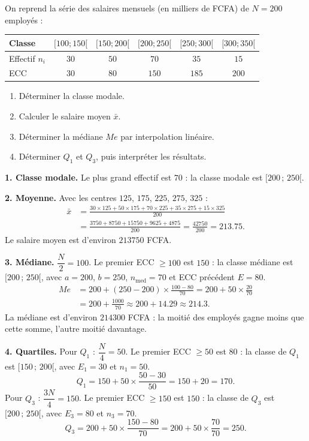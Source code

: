 \documentclass[11pt]{article}
\begin{document}
\begin{exoresolu}
On reprend la série des salaires mensuels (en milliers de FCFA) de $N=200$ employés :
\begin{center}
\begin{tabular}{|l|c|c|c|c|c|}
\hline
Classe & $[100;150[$ & $[150;200[$ & $[200;250[$ & $[250;300[$ & $[300;350[$ \\
\hline Effectif $n_i$ & $30$ & $50$ & $70$ & $35$ & $15$ \\
\hline ECC & $30$ & $80$ & $150$ & $185$ & $200$ \\
\hline
\end{tabular}
\end{center}
\begin{enumerate}
\item Déterminer la classe modale.
\item Calculer le salaire moyen $\bar{x}$.
\item Déterminer la médiane $Me$ par interpolation linéaire.
\item Déterminer $Q_1$ et $Q_3$, puis interpréter les résultats.
\end{enumerate}
\tcblower
\textbf{1. Classe modale.} Le plus grand effectif est $70$ : la classe modale est $[200\,;\,250[$.

\textbf{2. Moyenne.} Avec les centres $125$, $175$, $225$, $275$, $325$ :
\begin{align*}
\bar{x} &= \frac{30\times 125 + 50\times 175 + 70\times 225 + 35\times 275 + 15\times 325}{200} \\
&= \frac{\num{3750} + \num{8750} + \num{15750} + \num{9625} + \num{4875}}{200} = \frac{\num{42750}}{200} = \num{213,75}.
\end{align*}
Le salaire moyen est d'environ $\num{213750}$ FCFA.

\textbf{3. Médiane.} $\dfrac{N}{2} = 100$. Le premier ECC $\geq 100$ est $150$ : la classe médiane est $[200\,;\,250[$, avec $a=200$, $b=250$, $n_{\text{med}} = 70$ et ECC précédent $E = 80$.
\begin{align*}
Me &= 200 + (250-200)\times\frac{100 - 80}{70} = 200 + 50\times\frac{20}{70} \\
&= 200 + \frac{\num{1000}}{70} \approx 200 + \num{14,29} \approx \num{214,3}.
\end{align*}
La médiane est d'environ $\num{214300}$ FCFA : la moitié des employés gagne moins que cette somme, l'autre moitié davantage.

\textbf{4. Quartiles.} Pour $Q_1$ : $\dfrac{N}{4} = 50$. Le premier ECC $\geq 50$ est $80$ : la classe de $Q_1$ est $[150\,;\,200[$, avec $E_1 = 30$ et $n_1 = 50$.
\[ Q_1 = 150 + 50\times\frac{50-30}{50} = 150 + 20 = 170. \]
Pour $Q_3$ : $\dfrac{3N}{4} = 150$. Le premier ECC $\geq 150$ est $150$ : la classe de $Q_3$ est $[200\,;\,250[$, avec $E_3 = 80$ et $n_3 = 70$.
\[ Q_3 = 200 + 50\times\frac{150-80}{70} = 200 + 50\times\frac{70}{70} = 250. \]


\end{exoresolu}
\end{document}
